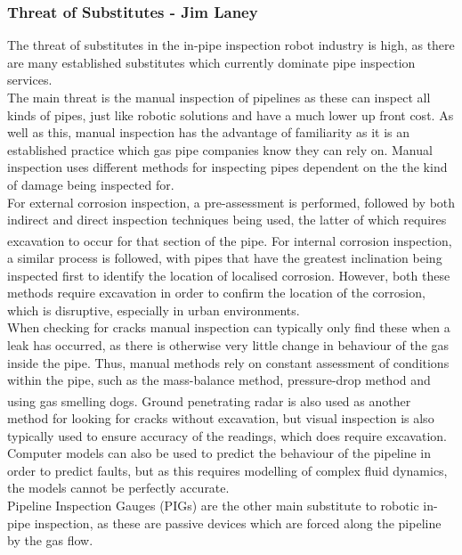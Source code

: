\documentclass[11pt]{article}		%
\newcommand{\supercite}[1]{\textsuperscript{\cite{#1}}}		%
\begin{document}
			
			\subsubsection{Threat of Substitutes - Jim Laney}
				
				The threat of substitutes in the in-pipe inspection robot industry is high, as there are many established substitutes which currently dominate pipe inspection services.
				\\
				The main threat is the manual inspection of pipelines as these can inspect all kinds of pipes, just like robotic solutions and have a much lower up front cost.
				As well as this, manual inspection has the advantage of familiarity as it is an established practice which gas pipe companies know they can rely on.
				Manual inspection uses different methods for inspecting pipes dependent on the the kind of damage being inspected for.
				\\
				For external corrosion inspection, a pre-assessment is performed, followed by both indirect and direct inspection techniques being used, the latter of which requires excavation to occur for that section of the pipe\supercite{kishawy2010review}. 
				For internal corrosion inspection, a similar process is followed, with pipes that have the greatest inclination being inspected first to identify the location of localised corrosion. 
				However, both these methods require excavation in order to confirm the location of the corrosion, which is disruptive, especially in urban environments.
				\\
				When checking for cracks manual inspection can typically only find these when a leak has occurred, as there is otherwise very little change in behaviour of the gas inside the pipe.
				Thus, manual methods rely on constant assessment of conditions within the pipe, such as the mass-balance method, pressure-drop method and using gas smelling dogs\supercite{kishawy2010review}.
				Ground penetrating radar is also used as another method for looking for cracks without excavation, but visual inspection is also typically used to ensure accuracy of the readings, which does require excavation.
				Computer models can also be used to predict the behaviour of the pipeline in order to predict faults, but as this requires modelling of complex fluid dynamics, the models cannot be perfectly accurate.
				\\
				Pipeline Inspection Gauges (PIGs) are the other main substitute to robotic in-pipe inspection, as these are passive devices which are forced along the pipeline by the gas flow.
\end{document}
